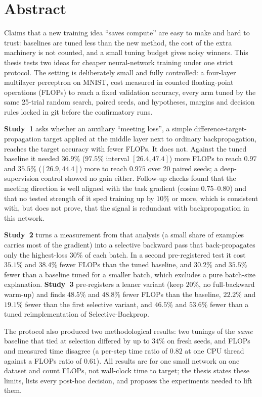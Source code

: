 \chapter*{Abstract}
Claims that a new training idea ``saves compute'' are easy to make and hard to trust: baselines are tuned less than the new method, the cost of the extra machinery is not counted, and a small tuning budget gives noisy winners. This thesis tests two ideas for cheaper neural-network training under one strict protocol. The setting is deliberately small and fully controlled: a four-layer multilayer perceptron on MNIST, cost measured in counted floating-point operations (FLOPs) to reach a fixed validation accuracy, every arm tuned by the same 25-trial random search, paired seeds, and hypotheses, margins and decision rules locked in git before the confirmatory runs.

\textbf{Study~1} asks whether an auxiliary ``meeting loss'', a simple difference-target-propagation target applied at the middle layer next to ordinary backpropagation, reaches the target accuracy with fewer FLOPs. It does not. Against the tuned baseline it needed $36.9\%$ ($97.5\%$ interval $[26.4,47.4]$) more FLOPs to reach $0.97$ and $35.5\%$ ($[26.9,44.4]$) more to reach $0.975$ over 20 paired seeds; a deep-supervision control showed no gain either. Follow-up checks found that the meeting direction is well aligned with the task gradient (cosine $0.75$--$0.80$) and that no tested strength of it sped training up by $10\%$ or more, which is consistent with, but does not prove, that the signal is redundant with backpropagation in this network.

\textbf{Study~2} turns a measurement from that analysis (a small share of examples carries most of the gradient) into a selective backward pass that back-propagates only the highest-loss $30\%$ of each batch. In a second pre-registered test it cost $35.1\%$ and $38.4\%$ fewer FLOPs than the tuned baseline, and $30.2\%$ and $35.5\%$ fewer than a baseline tuned for a smaller batch, which excludes a pure batch-size explanation. \textbf{Study~3} pre-registers a leaner variant (keep $20\%$, no full-backward warm-up) and finds $48.5\%$ and $48.8\%$ fewer FLOPs than the baseline, $22.2\%$ and $19.1\%$ fewer than the first selective variant, and $46.5\%$ and $53.6\%$ fewer than a tuned reimplementation of Selective-Backprop.

The protocol also produced two methodological results: two tunings of the \emph{same} baseline that tied at selection differed by up to $34\%$ on fresh seeds, and FLOPs and measured time disagree (a per-step time ratio of $0.82$ at one CPU thread against a FLOPs ratio of $0.61$). All results are for one small network on one dataset and count FLOPs, not wall-clock time to target; the thesis states these limits, lists every post-hoc decision, and proposes the experiments needed to lift them.
\cleardoublepage
